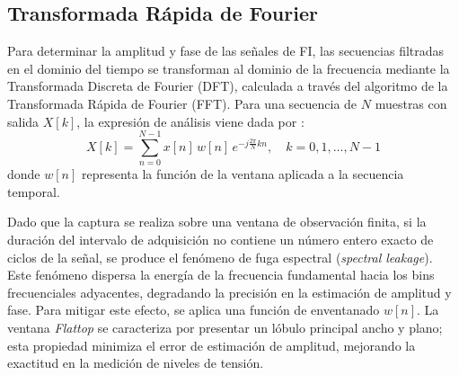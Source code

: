 \subsection{Transformada Rápida de Fourier}
Para determinar la amplitud y fase de las señales de FI, las secuencias filtradas en el dominio del tiempo se transforman al dominio de la frecuencia mediante la Transformada Discreta de Fourier (DFT), calculada a través del algoritmo de la Transformada Rápida de Fourier (FFT). Para una secuencia de $N$ muestras con salida $X[k]$, la expresión de análisis viene dada por \cite{TDSmanolakis}:
\begin{equation}
    X[k] = \sum_{n=0}^{N-1} x[n] \, w[n] \, e^{-j \frac{2\pi}{N} k n}, \quad k = 0, 1, \dots, N-1
\end{equation}
donde $w[n]$ representa la función de la ventana aplicada a la secuencia temporal.

Dado que la captura se realiza sobre una ventana de observación finita, si la duración del intervalo de adquisición no contiene un número entero exacto de ciclos de la señal, se produce el fenómeno de fuga espectral (\textit{spectral leakage}). Este fenómeno dispersa la energía de la frecuencia fundamental hacia los bins frecuenciales adyacentes, degradando la precisión en la estimación de amplitud y fase. Para mitigar este efecto, se aplica una función de enventanado $w[n]$. La ventana \textit{Flattop} se caracteriza por presentar un lóbulo principal ancho y plano; esta propiedad minimiza el error de estimación de amplitud, mejorando la exactitud en la medición de niveles de tensión.





